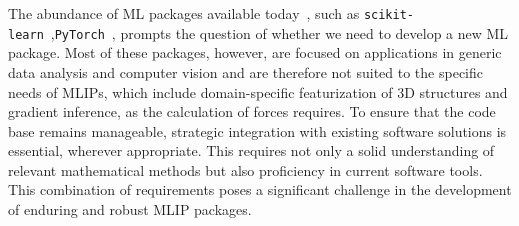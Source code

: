 The abundance of ML packages available today~\cite{Haddad2023Artificial}, such as \texttt{scikit-learn}~\cite{pedregosa2011scikit},\linebreak \texttt{PyTorch}~\cite{NEURIPS2019_9015}, prompts the question of whether we need to develop a new ML package.
Most of these packages, however, are focused on applications in generic data analysis and computer vision and are therefore not suited to the specific needs of MLIPs, which include domain-specific featurization of 3D structures and gradient inference, as the calculation of forces requires. %
To ensure that the code base remains manageable, strategic integration with existing software solutions is essential, wherever appropriate.
This requires not only a solid understanding of relevant mathematical methods but also proficiency in current software tools.
This combination of requirements poses a significant challenge in the development of enduring and robust MLIP packages.

